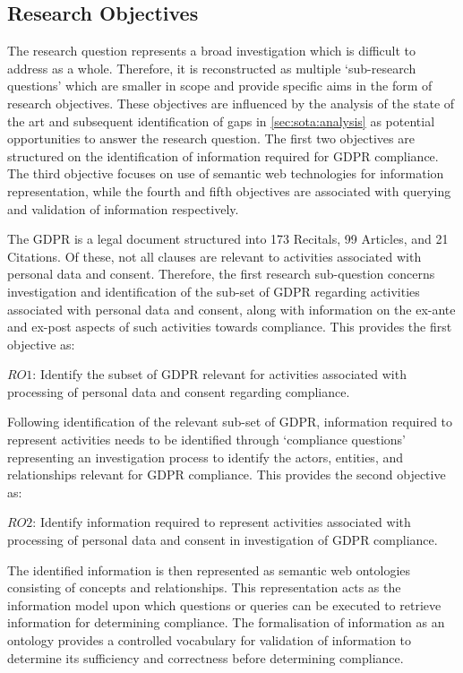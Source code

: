 \subsection{Research Objectives}\label{sec:intro:RO}
The research question represents a broad investigation which is difficult to address as a whole. Therefore, it is reconstructed as multiple `sub-research questions' which are smaller in scope and provide specific aims in the form of research objectives. These objectives are influenced by the analysis of the state of the art and subsequent identification of gaps in \autoref{sec:sota:analysis} as potential opportunities to answer the research question. 
The first two objectives are structured on the identification of information required for GDPR compliance. The third objective focuses on use of semantic web technologies for information representation, while the fourth and fifth objectives are associated with querying and validation of information respectively.

The GDPR is a legal document structured into 173 Recitals, 99 Articles, and 21 Citations. Of these, not all clauses are relevant to activities associated with personal data and consent. Therefore, the first research sub-question concerns investigation and identification of the sub-set of GDPR regarding activities associated with personal data and consent, along with information on the ex-ante and ex-post aspects of such activities towards compliance. This provides the first objective as:
\begin{framed}
$RO1$: Identify the subset of GDPR relevant for activities associated with processing of personal data and consent regarding compliance.
\end{framed}

Following identification of the relevant sub-set of GDPR, information required to represent activities needs to be identified through `compliance questions' representing an investigation process to identify the actors, entities, and relationships relevant for GDPR compliance. This provides the second objective as:
\begin{framed}
$RO2$: Identify information required to represent activities associated with processing of personal data and consent in investigation of GDPR compliance.
\end{framed}

The identified information is then represented as semantic web ontologies consisting of concepts and relationships. This representation acts as the information model upon which questions or queries can be executed to retrieve information for determining compliance. The formalisation of information as an ontology provides a controlled vocabulary for validation of information to determine its sufficiency and correctness before determining compliance. 

